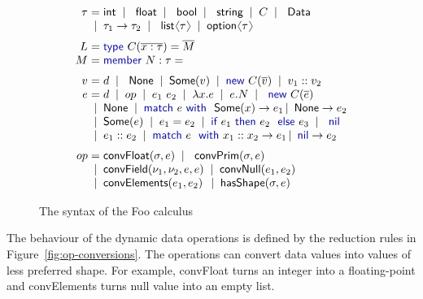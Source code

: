 \documentclass[10pt,preprint,blind,clearpagebib]{sigplanconf}
\newcommand{\langl}{\begin{picture}(4.5,7)
\put(1.1,2.5){\rotatebox{60}{\line(1,0){5.5}}}
\put(1.1,2.5){\rotatebox{300}{\line(1,0){5.5}}}
\end{picture}}
\newcommand{\rangl}{\begin{picture}(4.5,7)
\put(.9,2.5){\rotatebox{120}{\line(1,0){5.5}}}
\put(.9,2.5){\rotatebox{240}{\line(1,0){5.5}}}
\end{picture}}
\newcommand{\kvd}[1]{\textnormal{\textcolor{kvdclr}{\sffamily #1}}}
\newcommand{\num}[1]{\textnormal{\textcolor{numclr}{\sffamily #1}}}
\newcommand{\ident}[1]{\textnormal{\sffamily #1}}
\newcommand{\lsep}[0]{\;\; | \;\;}
\newcommand{\narrow}[1]{\hspace{-0.7em} #1 \hspace{-0.7em}}
\begin{document}

\begin{figure}[!h]
\noindent
\begin{equation*}
\begin{array}{rcl}
 \tau &\narrow{=}& \ident{int} \lsep \ident{float} \lsep \ident{bool} \lsep \ident{string} \lsep C \lsep \ident{Data} \\[0.0em]
      &\narrow{|}& \tau_1 \rightarrow \tau_2 \lsep \ident{list}\langl\tau\rangl \lsep \ident{option}\langl\tau\rangl 
\\[0.6em]
 L &\narrow{=}& \kvd{type}~C(\overline{x:\tau}) = \overline{M} \\[0.0em]
 M &\narrow{=}& \kvd{member}~N:\tau=
\\[0.6em]
 v &\narrow{=}& d \lsep \ident{None} \lsep \ident{Some}(v) \lsep \kvd{new}~C(\overline{v}) \lsep v_1::v_2 \\[0.0em]
 e &\narrow{=}& d \lsep op \lsep e_1~e_2 \lsep \lambda x.e \lsep e.N \lsep \kvd{new}~C(\overline{e}) \\
   &\narrow{|}& \ident{None} \lsep\kvd{match}~e~\kvd{with}~\ident{Some}(x) \rightarrow e_1 \,|\, \ident{None} \rightarrow e_2 \\
   &\narrow{|}& \ident{Some}(e) \lsep e_1 = e_2 \lsep {\kvd{if}~e_1~\kvd{then}~e_2~\kvd{else}~e_3} \lsep \kvd{nil} \\
   &\narrow{|}& e_1 :: e_2 \lsep \kvd{match}~e~\kvd{with}~x_1::x_2 \rightarrow e_1 \,|\, \kvd{nil} \rightarrow e_2 
\\[0.6em]
op &\narrow{=}& \ident{convFloat}(\sigma, e) \lsep \ident{convPrim}(\sigma, e) \\
   &\narrow{|}& \ident{convField}(\nu_1, \nu_2, e, e) \lsep \ident{convNull}(e_1, e_2) \\
   &\narrow{|}& \ident{convElements}(e_1, e_2) \,\lsep \ident{hasShape}(\sigma, e) 
\end{array}
\end{equation*}

\caption{The syntax of the Foo calculus}
\label{fig:foo-syntax}
\vspace{-0.5em}
\end{figure}


The behaviour of the dynamic data operations is defined by the reduction rules in 
Figure~\ref{fig:op-conversions}. The operations can convert data values into values of 
less preferred shape. For example, \ident{convFloat} turns an integer \num{1} into 
a floating-point \num{1.0} and \ident{convElements} turns \kvd{null} value into an empty list.
\end{document}
